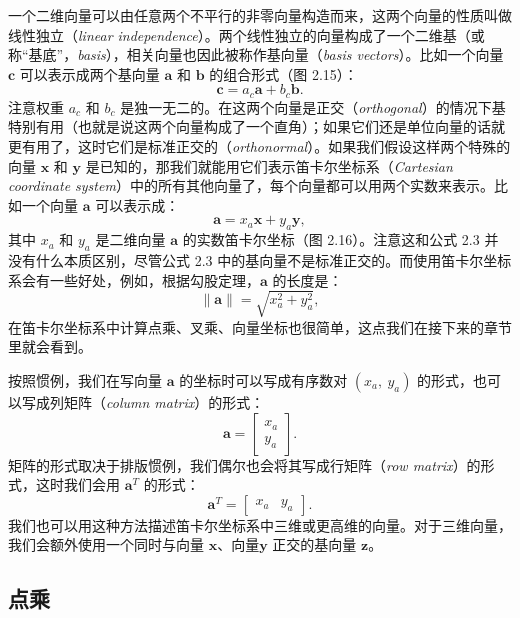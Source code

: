 \documentclass[lang=cn,12pt,marginpar=margintrue]{elegantbook}
\begin{document}
一个二维向量可以由任意两个不平行的非零向量构造而来，这两个向量的性质叫做线性独立（\textit{linear independence}）。两个线性独立的向量构成了一个二维基（或称“基底”，\textit{basis}），相关向量也因此被称作基向量（\textit{basis vectors}）。比如一个向量 $\mathbf{c}$ 可以表示成两个基向量 $\mathbf{a}$ 和 $\mathbf{b}$ 的组合形式（图 2.15）：
\begin{equation}
  \mathbf{c} = a_c\mathbf{a} + b_c\mathbf{b}.
\end{equation}
注意权重 $a_c$ 和 $b_c$ 是独一无二的。在这两个向量是正交（\textit{orthogonal}）的情况下基特别有用（也就是说这两个向量构成了一个直角）；如果它们还是单位向量的话就更有用了，这时它们是标准正交的（\textit{orthonormal}）。如果我们假设这样两个特殊的向量 $\mathbf{x}$ 和 $\mathbf{y}$ 是已知的，那我们就能用它们表示笛卡尔坐标系（\textit{Cartesian coordinate system}）中的所有其他向量了，每个向量都可以用两个实数来表示。比如一个向量 $\mathbf{a}$ 可以表示成：
\[
  \mathbf{a} = x_a\mathbf{x} + y_a\mathbf{y},
\]
其中 $x_a$ 和 $y_a$ 是二维向量 $\mathbf{a}$ 的实数笛卡尔坐标（图 2.16）。注意这和公式 2.3 并没有什么本质区别，尽管公式 2.3 中的基向量不是标准正交的。而使用笛卡尔坐标系会有一些好处，例如，根据勾股定理，$\mathbf{a}$ 的长度是：
\[
  \| \mathbf{a} \| = \sqrt{x_a^2 + y_a^2},
\]
在笛卡尔坐标系中计算点乘、叉乘、向量坐标也很简单，这点我们在接下来的章节里就会看到。

按照惯例，我们在写向量 $\mathbf{a}$ 的坐标时可以写成有序数对 $(x_a,\ y_a)$ 的形式，也可以写成列矩阵（\textit{column matrix}）的形式：
\[
  \mathbf{a} = \begin{bmatrix}
    x_a \\
    y_a
  \end{bmatrix}.
\]
矩阵的形式取决于排版惯例，我们偶尔也会将其写成行矩阵（\textit{row matrix}）的形式，这时我们会用 $\mathbf{a}^T$ 的形式：
\[
  \mathbf{a}^T = \begin{bmatrix}
    x_a & y_a
  \end{bmatrix}.
\]
我们也可以用这种方法描述笛卡尔坐标系中三维或更高维的向量。对于三维向量，我们会额外使用一个同时与向量 $\mathbf{x}$、向量$\mathbf{y}$ 正交的基向量 $\mathbf{z}$。

\subsection{点乘}
\end{document}
